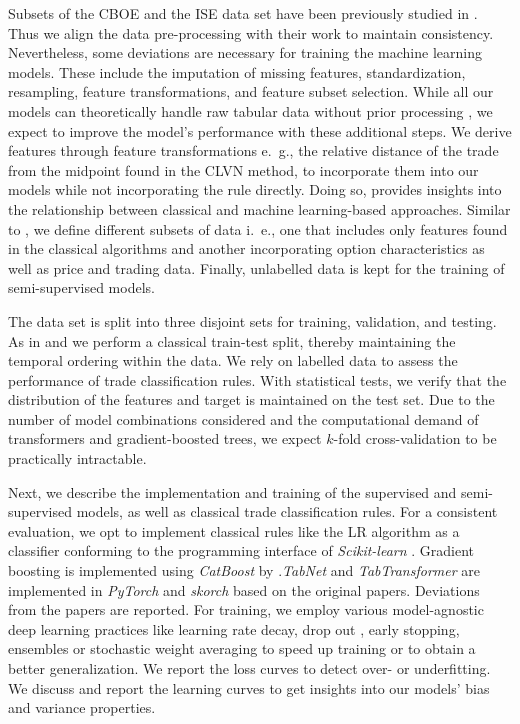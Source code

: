 Subsets of the \gls{CBOE} and the \gls{ISE} data set have been previously studied in \textcite{grauerOptionTradeClassification2022}. Thus we align the data pre-processing with their work to maintain consistency. Nevertheless, some deviations are necessary for training the machine learning models. These include the imputation of missing features, standardization, resampling, feature transformations, and feature subset selection. While all our models can theoretically handle raw tabular data without prior processing \autocites{arikTabNetAttentiveInterpretable2020}{prokhorenkovaCatBoostUnbiasedBoosting2018}{huangTabTransformerTabularData2020}, we expect to improve the model's performance with these additional steps. We derive features through feature transformations e.~g., the relative distance of the trade from the midpoint found in the CLVN method, to incorporate them into our models while not incorporating the rule directly. Doing so, provides insights into the relationship between classical and machine learning-based approaches. Similar to \textcite{ronenMachineLearningTrade2022}, we define different subsets of data i.~e., one that includes only features found in the classical algorithms and another incorporating option characteristics as well as price and trading data. Finally, unlabelled data is kept for the training of semi-supervised models.

The data set is split into three disjoint sets for training, validation, and testing. As in \textcite{ellisAccuracyTradeClassification2000} and \textcite{ronenMachineLearningTrade2022} we perform a classical train-test split, thereby maintaining the temporal ordering within the data. We rely on labelled data to assess the performance of trade classification rules. With statistical tests, we verify that the distribution of the features and target is maintained on the test set. Due to the number of model combinations considered and the computational demand of transformers and gradient-boosted trees, we expect $k$-fold cross-validation to be practically intractable.

Next, we describe the implementation and training of the supervised and semi-supervised models, as well as classical trade classification rules. 
For a consistent evaluation, we opt to implement classical rules like the LR algorithm as a classifier conforming to the programming interface of \textit{Scikit-learn} \autocite{pedregosaScikitlearnMachineLearning2018}.
Gradient boosting is implemented using \textit{CatBoost} by \textcite{prokhorenkovaCatBoostUnbiasedBoosting2018}.\textit{TabNet} and \textit{TabTransformer} are implemented in \textit{PyTorch} \autocite{paszkePyTorchImperativeStyle2019} and \textit{skorch} based on the original papers. Deviations from the papers are reported.
For training, we employ various model-agnostic deep learning practices like learning rate decay, drop out \autocite{hintonImprovingNeuralNetworks2012}, early stopping, ensembles \autocite{huangSnapshotEnsemblesTrain2017} or stochastic weight averaging \autocite{izmailovAveragingWeightsLeads2019} to speed up training or to obtain a better generalization. We report the loss curves to detect over- or underfitting. We discuss and report the learning curves to get insights into our models' bias and variance properties.  

